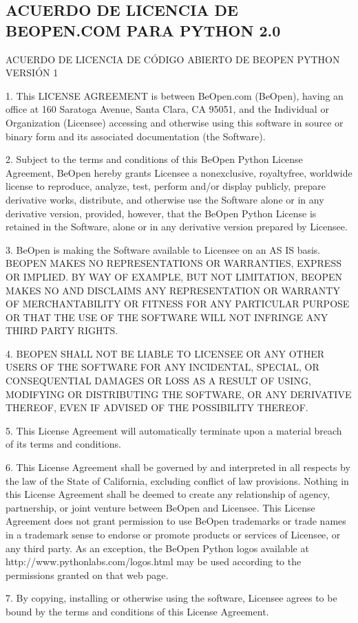 \documentclass[a4,10pt,spanish]{sphinxmanual}
\begin{document}
\subsection{ACUERDO DE LICENCIA DE BEOPEN.COM PARA PYTHON 2.0}
\label{\detokenize{license:beopen-com-license-agreement-for-python-2-0}}
\sphinxAtStartPar
ACUERDO DE LICENCIA DE CÓDIGO ABIERTO DE BEOPEN PYTHON VERSIÓN 1

\begin{sphinxVerbatim}[commandchars=\\\{\}]
1. This LICENSE AGREEMENT is between BeOpen.com (\PYGZdq{}BeOpen\PYGZdq{}), having an office at
   160 Saratoga Avenue, Santa Clara, CA 95051, and the Individual or Organization
   (\PYGZdq{}Licensee\PYGZdq{}) accessing and otherwise using this software in source or binary
   form and its associated documentation (\PYGZdq{}the Software\PYGZdq{}).

2. Subject to the terms and conditions of this BeOpen Python License Agreement,
   BeOpen hereby grants Licensee a non\PYGZhy{}exclusive, royalty\PYGZhy{}free, world\PYGZhy{}wide license
   to reproduce, analyze, test, perform and/or display publicly, prepare derivative
   works, distribute, and otherwise use the Software alone or in any derivative
   version, provided, however, that the BeOpen Python License is retained in the
   Software, alone or in any derivative version prepared by Licensee.

3. BeOpen is making the Software available to Licensee on an \PYGZdq{}AS IS\PYGZdq{} basis.
   BEOPEN MAKES NO REPRESENTATIONS OR WARRANTIES, EXPRESS OR IMPLIED.  BY WAY OF
   EXAMPLE, BUT NOT LIMITATION, BEOPEN MAKES NO AND DISCLAIMS ANY REPRESENTATION OR
   WARRANTY OF MERCHANTABILITY OR FITNESS FOR ANY PARTICULAR PURPOSE OR THAT THE
   USE OF THE SOFTWARE WILL NOT INFRINGE ANY THIRD PARTY RIGHTS.

4. BEOPEN SHALL NOT BE LIABLE TO LICENSEE OR ANY OTHER USERS OF THE SOFTWARE FOR
   ANY INCIDENTAL, SPECIAL, OR CONSEQUENTIAL DAMAGES OR LOSS AS A RESULT OF USING,
   MODIFYING OR DISTRIBUTING THE SOFTWARE, OR ANY DERIVATIVE THEREOF, EVEN IF
   ADVISED OF THE POSSIBILITY THEREOF.

5. This License Agreement will automatically terminate upon a material breach of
   its terms and conditions.

6. This License Agreement shall be governed by and interpreted in all respects
   by the law of the State of California, excluding conflict of law provisions.
   Nothing in this License Agreement shall be deemed to create any relationship of
   agency, partnership, or joint venture between BeOpen and Licensee.  This License
   Agreement does not grant permission to use BeOpen trademarks or trade names in a
   trademark sense to endorse or promote products or services of Licensee, or any
   third party.  As an exception, the \PYGZdq{}BeOpen Python\PYGZdq{} logos available at
   http://www.pythonlabs.com/logos.html may be used according to the permissions
   granted on that web page.

7. By copying, installing or otherwise using the software, Licensee agrees to be
   bound by the terms and conditions of this License Agreement.
\end{sphinxVerbatim}
\end{document}

